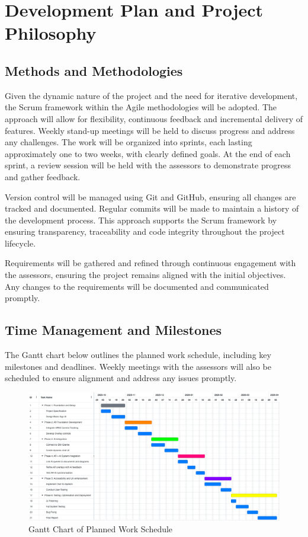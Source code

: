 \documentclass[12pt]{article}
\begin{document}
\section{Development Plan and Project Philosophy}

    \subsection{Methods and Methodologies}

    Given the dynamic nature of the project and the need for iterative development, the Scrum framework within the Agile methodologies will be adopted. The approach will allow for flexibility, continuous feedback
    and incremental delivery of features. Weekly stand-up meetings will be held to discuss progress and address any challenges. The work will be organized into sprints, each lasting approximately one to two weeks,
    with clearly defined goals. At the end of each sprint, a review session will be held with the assessors to demonstrate progress and gather feedback.
    
    Version control will be managed using Git and GitHub, ensuring all changes are tracked and documented. Regular commits will be made to maintain a history of the development process. This
    approach supports the Scrum framework by ensuring transparency, traceability and code integrity throughout the project lifecycle.

    Requirements will be gathered and refined through continuous engagement with the assessors, ensuring the project remains aligned with the initial objectives. Any changes to the requirements will be documented and communicated promptly. 
    \subsection{Time Management and Milestones}
        The Gantt chart below outlines the planned work schedule, including key milestones and deadlines. Weekly meetings with the assessors will also be scheduled to ensure alignment and address any issues promptly. 
        \begin{figure}[H]
        \centering
        \includegraphics[width=\textwidth]{img/GanttChart.png}
        \caption{Gantt Chart of Planned Work Schedule}
        \label{fig:GanttChart}
        \end{figure}
\end{document}
